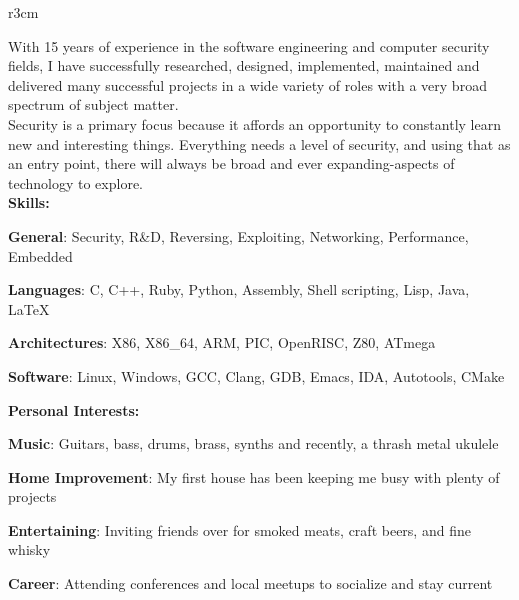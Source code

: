 \documentclass[]{SBResume}
\begin{document}
\makeheader


\begin{resume}
  
  \begin{resumetext}
    \begin{wrapfigure}{r}{3cm}
    \insertheadshot
    \end{wrapfigure}
    With 15 years of experience in the software engineering and
    computer security fields, I have successfully researched,
    designed, implemented, maintained and delivered many successful
    projects in a wide variety of roles with a very broad spectrum of
    subject matter.\\
    
    Security is a primary focus because it affords an opportunity to
    constantly learn new and interesting things. Everything needs a
    level of security, and using that as an entry point, there will
    always be broad and ever expanding-aspects of technology to
    explore.\\
    
    \textbf{Skills:}
    \begin{resumeitemize2}
    \item{\textbf{General}: Security, R\&D, Reversing, Exploiting, Networking, Performance, Embedded}
    \item{\textbf{Languages}: C, C++, Ruby, Python, Assembly, Shell scripting, Lisp, Java, \LaTeX}
    \item{\textbf{Architectures}: X86, X86\_64, ARM, PIC, OpenRISC, Z80, ATmega }
    \item{\textbf{Software}: Linux, Windows, GCC, Clang, GDB, Emacs, IDA, Autotools, CMake}
    \end{resumeitemize2}
    
    \textbf{Personal Interests:}
    \begin{resumeitemize2}
    \item{\textbf{Music}: Guitars, bass, drums, brass, synths and recently, a thrash metal ukulele}
    \item{\textbf{Home Improvement}: My first house has been keeping me busy with plenty of projects}
    \item{\textbf{Entertaining}: Inviting friends over for smoked meats, craft beers, and fine whisky}
    \item{\textbf{Career}: Attending conferences and local meetups to socialize and stay current}
    \end{resumeitemize2}



\end{resumetext}
\end{resume}
\end{document}
